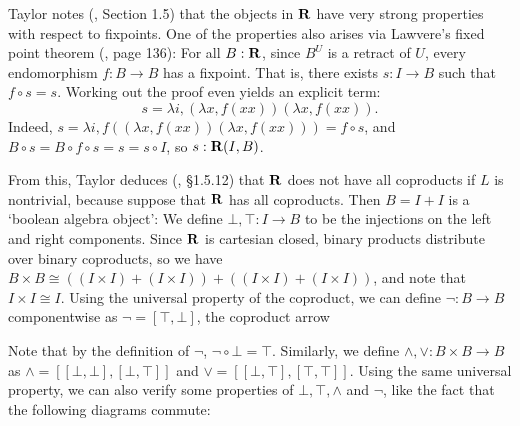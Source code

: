 Taylor notes (\cite{taylor}, Section 1.5) that the objects in $ \mathbf{R} $ have very strong properties with respect to fixpoints. One of the properties also arises via Lawvere's fixed point theorem (\cite{lawvere-fixpoints}, page 136): For all $ B: \mathbf{R} $, since $ B^U $ is a retract of $ U $, every endomorphism $ f: B \to B $ has a fixpoint. That is, there exists $ s: I \to B $ such that $ f \circ s = s $. Working out the proof even yields an explicit term:
\[ s = \lambda i, (\lambda x, f (x x)) (\lambda x, f (x x)). \]
Indeed, $ s = \lambda i, f ((\lambda x, f (x x)) (\lambda x, f (x x))) = f \circ s $, and $ B \circ s = B \circ f \circ s = s = s \circ I $, so $ s : \mathbf{R}(I, B) $.

From this, Taylor deduces (\cite{taylor}, \S 1.5.12) that $ \mathbf{R} $ does not have all coproducts if $ L $ is nontrivial, because suppose that $ \mathbf{R} $ has all coproducts. Then $ B = I + I $ is a `boolean algebra object': We define $ \bot, \top: I \to B $ to be the injections on the left and right components. Since $ \mathbf{R} $ is cartesian closed, binary products distribute over binary coproducts, so we have $ B \times B \cong ((I \times I) + (I \times I)) + ((I \times I) + (I \times I)) $, and note that $ I \times I \cong I $. Using the universal property of the coproduct, we can define $ \lnot: B \to B $ componentwise as $ \lnot = [\top, \bot] $, the coproduct arrow
\begin{center}
\end{center}
Note that by the definition of $ \lnot $, $ \lnot \circ \bot = \top $. Similarly, we define $ \land, \lor : B \times B \to B $ as $ \land = [[\bot, \bot], [\bot, \top]] $ and $ \lor = [[\bot, \top], [\top, \top]] $. Using the same universal property, we can also verify some properties of $ \bot, \top, \land $ and $ \lnot $, like the fact that the following diagrams commute:
